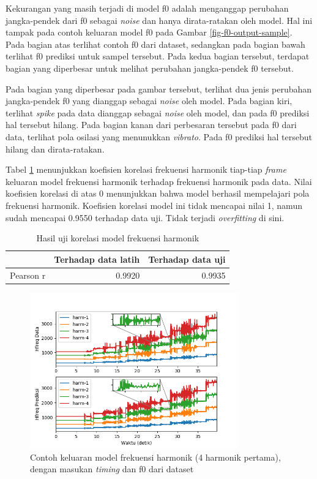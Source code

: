 Kekurangan yang masih terjadi di model f0 adalah menganggap perubahan jangka-pendek dari f0 sebagai \textit{noise} dan hanya dirata-ratakan oleh model. Hal ini tampak pada contoh keluaran model f0 pada Gambar \ref{fig-f0-output-sample}. Pada bagian atas terlihat contoh f0 dari dataset, sedangkan pada bagian bawah terlihat f0 prediksi untuk sampel tersebut. Pada kedua bagian tersebut, terdapat bagian yang diperbesar untuk melihat perubahan jangka-pendek f0 tersebut. 

Pada bagian yang diperbesar pada gambar tersebut, terlihat dua jenis perubahan jangka-pendek f0 yang dianggap sebagai \textit{noise} oleh model. Pada bagian kiri, terlihat \textit{spike} pada data dianggap sebagai \textit{noise} oleh model, dan pada f0 prediksi hal tersebut hilang. Pada bagian kanan dari perbesaran tersebut pada f0 dari data, terlihat pola osilasi yang menunukkan \textit{vibrato}. Pada f0 prediksi hal tersebut hilang dan dirata-ratakan.

Tabel \ref{tab-freq-testing-results} menunjukkan koefisien korelasi frekuensi harmonik tiap-tiap \textit{frame} keluaran model frekuensi harmonik terhadap frekuensi harmonik pada data. Nilai koefisien korelasi di atas 0 menunjukkan bahwa model berhasil mempelajari pola frekuensi harmonik. Koefisien korelasi model ini tidak mencapai nilai 1, namun sudah mencapai 0.9550 terhadap data uji. Tidak terjadi \textit{overfitting} di sini.
\begin{table}[htbp]
    \centering
    \caption{Hasil uji korelasi model frekuensi harmonik}\label{tab-freq-testing-results}
    \begin{tabular}{ |l|r|r| } 
     \cline{2-3}
     \multicolumn{1}{l|}{}&Terhadap data latih&Terhadap data uji\\\hline
	 Pearson r&0.9920  &0.9935\\\hline
    \end{tabular}
\end{table}

\begin{figure}[h]
    \centering
    \includegraphics[width=0.8\textwidth]{resources/Analisis_Hfreq.png}
    \caption{Contoh keluaran model frekuensi harmonik (4 harmonik pertama), dengan masukan \textit{timing} dan f0 dari dataset}\label{fig-hfreq-output-sample}
\end{figure}

